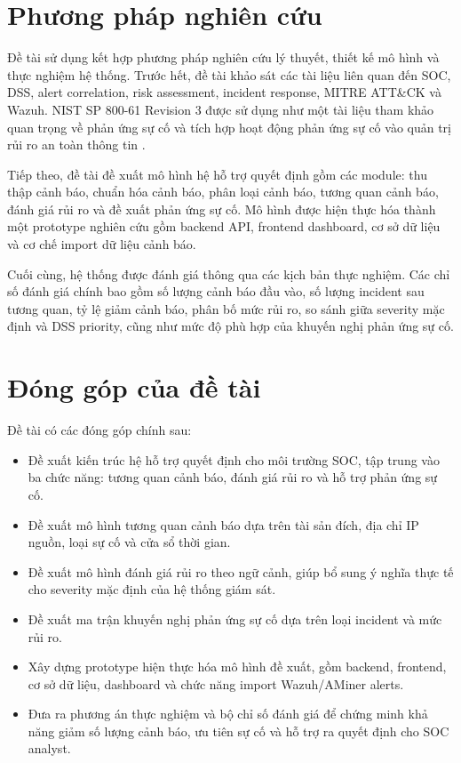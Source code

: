 \documentclass[a4paper,12pt,oneside]{book}
\begin{document}
\section{Phương pháp nghiên cứu}
{\fontsize{13pt}{15.6pt}\selectfont

Đề tài sử dụng kết hợp phương pháp nghiên cứu lý thuyết, thiết kế mô hình và thực nghiệm hệ thống. Trước hết, đề tài khảo sát các tài liệu liên quan đến SOC, DSS, alert correlation, risk assessment, incident response, MITRE ATT\&CK và Wazuh. NIST SP 800-61 Revision 3 được sử dụng như một tài liệu tham khảo quan trọng về phản ứng sự cố và tích hợp hoạt động phản ứng sự cố vào quản trị rủi ro an toàn thông tin \cite{nist80061r3}.

\noindent Tiếp theo, đề tài đề xuất mô hình hệ hỗ trợ quyết định gồm các module: thu thập cảnh báo, chuẩn hóa cảnh báo, phân loại cảnh báo, tương quan cảnh báo, đánh giá rủi ro và đề xuất phản ứng sự cố. Mô hình được hiện thực hóa thành một prototype nghiên cứu gồm backend API, frontend dashboard, cơ sở dữ liệu và cơ chế import dữ liệu cảnh báo.

\noindent Cuối cùng, hệ thống được đánh giá thông qua các kịch bản thực nghiệm. Các chỉ số đánh giá chính bao gồm số lượng cảnh báo đầu vào, số lượng incident sau tương quan, tỷ lệ giảm cảnh báo, phân bố mức rủi ro, so sánh giữa severity mặc định và DSS priority, cũng như mức độ phù hợp của khuyến nghị phản ứng sự cố.

}

\section{Đóng góp của đề tài}
{\fontsize{13pt}{15.6pt}\selectfont

Đề tài có các đóng góp chính sau:

\begin{itemize}
    \item Đề xuất kiến trúc hệ hỗ trợ quyết định cho môi trường SOC, tập trung vào ba chức năng: tương quan cảnh báo, đánh giá rủi ro và hỗ trợ phản ứng sự cố.
    \item Đề xuất mô hình tương quan cảnh báo dựa trên tài sản đích, địa chỉ IP nguồn, loại sự cố và cửa sổ thời gian.
    \item Đề xuất mô hình đánh giá rủi ro theo ngữ cảnh, giúp bổ sung ý nghĩa thực tế cho severity mặc định của hệ thống giám sát.
    \item Đề xuất ma trận khuyến nghị phản ứng sự cố dựa trên loại incident và mức rủi ro.
    \item Xây dựng prototype hiện thực hóa mô hình đề xuất, gồm backend, frontend, cơ sở dữ liệu, dashboard và chức năng import Wazuh/AMiner alerts.
    \item Đưa ra phương án thực nghiệm và bộ chỉ số đánh giá để chứng minh khả năng giảm số lượng cảnh báo, ưu tiên sự cố và hỗ trợ ra quyết định cho SOC analyst.
\end{itemize}

}
\end{document}
